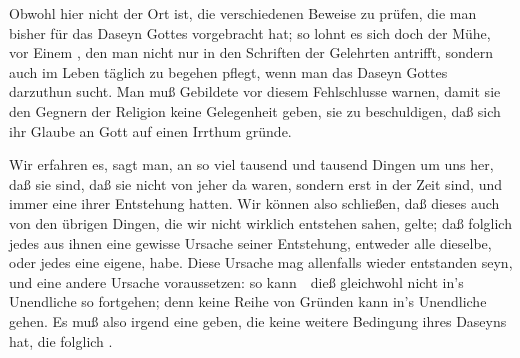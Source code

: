 \begin{aufza}
\item Obwohl hier nicht der Ort ist, die verschiedenen Beweise zu prüfen, die man bisher für das Daseyn Gottes vorgebracht hat; so lohnt es sich doch der Mühe, vor Einem , den man nicht nur in den Schriften der Gelehrten antrifft, sondern auch im  Leben täglich zu begehen pflegt, wenn man das Daseyn Gottes darzuthun sucht. Man muß Gebildete vor diesem Fehlschlusse warnen, damit sie den Gegnern der Religion keine Gelegenheit geben, sie zu beschuldigen, daß sich ihr Glaube an Gott auf einen Irrthum gründe.
\item Wir erfahren es, sagt man, an so viel tausend und tausend Dingen um uns her, daß sie  sind, daß sie nicht von jeher da waren, sondern erst in der Zeit  sind, und immer eine  ihrer Entstehung hatten. Wir können also schließen, daß dieses auch von den übrigen Dingen, die wir nicht wirklich entstehen sahen, gelte; daß folglich jedes aus ihnen eine gewisse Ursache seiner Entstehung, entweder alle dieselbe, oder jedes eine eigene, habe. Diese Ursache mag allenfalls wieder entstanden seyn, und eine andere Ursache voraussetzen: so kann~\ dieß gleichwohl nicht in's Unendliche so fortgehen; denn keine Reihe von Gründen kann in's Unendliche gehen. Es muß also irgend eine  geben, die keine weitere Bedingung ihres Daseyns hat, die folglich .

\end{aufza}

